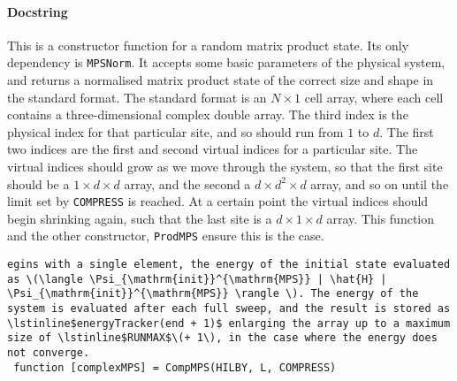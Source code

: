  \paragraph{Docstring}
 This is a constructor function for a random matrix product state. Its only dependency is \lstinline$MPSNorm$. It accepts some basic parameters of the physical system, and returns a normalised matrix product state of the correct size and shape in the standard format. The standard format is an \(N \times 1\) cell array, where each cell contains a three-dimensional complex double array. The third index is the physical index for that particular site, and so should run from \(1\) to \(d\). The first two indices are the first and second virtual indices for a particular site. The virtual indices should grow as we move through the system, so that the first site should be a \(1 \times d \times d\) array, and the second a \(d \times d^{2} \times d\) array, and so on until the limit set by \lstinline$COMPRESS$ is reached. At a certain point the virtual indices should begin shrinking again, such that the last site is a \(d \times 1 \times d\) array. This function and the other constructor, \lstinline$ProdMPS$ ensure this is the case.  
 \begin{lstlisting}egins with a single element, the energy of the initial state evaluated as \(\langle \Psi_{\mathrm{init}}^{\mathrm{MPS}} | \hat{H} | \Psi_{\mathrm{init}}^{\mathrm{MPS}} \rangle \). The energy of the system is evaluated after each full sweep, and the result is stored as \lstinline$energyTracker(end + 1)$ enlarging the array up to a maximum size of \lstinline$RUNMAX$\(+ 1\), in the case where the energy does not converge.
 function [complexMPS] = CompMPS(HILBY, L, COMPRESS) \end{lstlisting}
